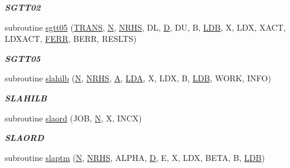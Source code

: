 \begin{DoxyCompactItemize}
\begin{DoxyCompactList}\small\item\em {\bfseries S\+G\+T\+T02} \end{DoxyCompactList}\item 
subroutine \hyperlink{group__single__lin_ga4b76120b9ef8b44fe19bced01921c4bd}{sgtt05} (\hyperlink{superlu__enum__consts_8h_a0c4e17b2d5cea33f9991ccc6a6678d62a1f61e3015bfe0f0c2c3fda4c5a0cdf58}{T\+R\+A\+N\+S}, \hyperlink{polmisc_8c_a0240ac851181b84ac374872dc5434ee4}{N}, \hyperlink{example__user_8c_aa0138da002ce2a90360df2f521eb3198}{N\+R\+H\+S}, D\+L, \hyperlink{odrpack_8h_a7dae6ea403d00f3687f24a874e67d139}{D}, D\+U, B, \hyperlink{example__user_8c_a50e90a7104df172b5a89a06c47fcca04}{L\+D\+B}, X, L\+D\+X, X\+A\+C\+T, L\+D\+X\+A\+C\+T, \hyperlink{superlu__enum__consts_8h_af00a42ecad444bbda75cde1b64bd7e72a78fd14d7abebae04095cfbe02928f153}{F\+E\+R\+R}, B\+E\+R\+R, R\+E\+S\+L\+T\+S)
\begin{DoxyCompactList}\small\item\em {\bfseries S\+G\+T\+T05} \end{DoxyCompactList}\item 
subroutine \hyperlink{group__single__lin_ga143acfd9b7157658b8e2582fc6673e53}{slahilb} (\hyperlink{polmisc_8c_a0240ac851181b84ac374872dc5434ee4}{N}, \hyperlink{example__user_8c_aa0138da002ce2a90360df2f521eb3198}{N\+R\+H\+S}, \hyperlink{classA}{A}, \hyperlink{example__user_8c_ae946da542ce0db94dced19b2ecefd1aa}{L\+D\+A}, X, L\+D\+X, B, \hyperlink{example__user_8c_a50e90a7104df172b5a89a06c47fcca04}{L\+D\+B}, W\+O\+R\+K, I\+N\+F\+O)
\begin{DoxyCompactList}\small\item\em {\bfseries S\+L\+A\+H\+I\+L\+B} \end{DoxyCompactList}\item 
subroutine \hyperlink{group__single__lin_ga23c73570c081e354d7c4dadef6450fd9}{slaord} (J\+O\+B, \hyperlink{polmisc_8c_a0240ac851181b84ac374872dc5434ee4}{N}, X, I\+N\+C\+X)
\begin{DoxyCompactList}\small\item\em {\bfseries S\+L\+A\+O\+R\+D} \end{DoxyCompactList}\item 
subroutine \hyperlink{group__single__lin_gaf7fbe7842daa7c2a830c5a3245cc7d1a}{slaptm} (\hyperlink{polmisc_8c_a0240ac851181b84ac374872dc5434ee4}{N}, \hyperlink{example__user_8c_aa0138da002ce2a90360df2f521eb3198}{N\+R\+H\+S}, A\+L\+P\+H\+A, \hyperlink{odrpack_8h_a7dae6ea403d00f3687f24a874e67d139}{D}, E, X, L\+D\+X, B\+E\+T\+A, B, \hyperlink{example__user_8c_a50e90a7104df172b5a89a06c47fcca04}{L\+D\+B})

\end{DoxyCompactItemize}
